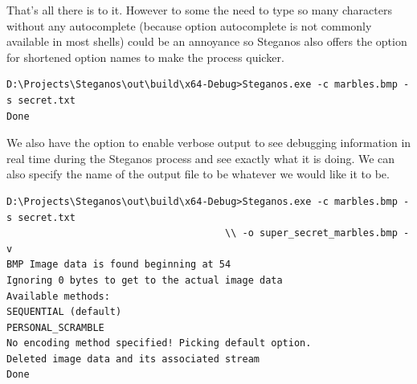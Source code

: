 \begin{multicols}{2}
That's all there is to it. However to some the need to type so many characters without any autocomplete (because option autocomplete is not commonly available in most shells) could be an annoyance so Steganos also offers the option for shortened option names to make the process quicker.
\end{multicols}
\begin{verbatim}
D:\Projects\Steganos\out\build\x64-Debug>Steganos.exe -c marbles.bmp -s secret.txt
Done
\end{verbatim}

\begin{multicols}{2}
We also have the option to enable verbose output to see debugging information in real time during the Steganos process and see exactly what it is doing. We can also specify the name of the output file to be whatever we would like it to be.
\end{multicols}
\begin{verbatim}
D:\Projects\Steganos\out\build\x64-Debug>Steganos.exe -c marbles.bmp -s secret.txt 
                                      \\ -o super_secret_marbles.bmp -v
BMP Image data is found beginning at 54
Ignoring 0 bytes to get to the actual image data
Available methods:
SEQUENTIAL (default)
PERSONAL_SCRAMBLE
No encoding method specified! Picking default option.
Deleted image data and its associated stream
Done
\end{verbatim}

